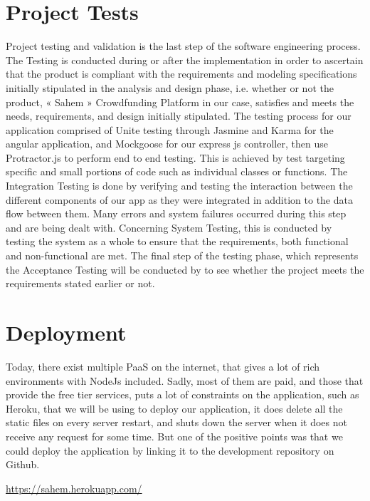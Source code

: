 \section{Project Tests}
Project testing and validation is the last step of the software engineering process. The
Testing is conducted during or after the implementation in order to ascertain that the product is
compliant with the requirements and modeling specifications initially stipulated in the
analysis and design phase, i.e. whether or not the product, « Sahem » Crowdfunding Platform
in our case, satisfies and meets the needs, requirements, and design initially stipulated.
The testing process for our application comprised of Unite testing through Jasmine and Karma for
the angular application, and Mockgoose for our express js controller, then use Protractor.js to perform
end to end testing.
This is achieved by test targeting specific and small portions of code such as individual classes or
functions. 
The Integration Testing is done by verifying and testing the interaction between the
different components of our app as they were integrated in addition to the data flow between
them.
 Many errors and system failures occurred during this step and are being dealt
with. Concerning System Testing, this is conducted by testing the system as a whole to ensure
that the requirements, both functional and non-functional are met. The final step of the testing
phase, which represents the Acceptance Testing will be conducted by \mentor to see whether the project
meets the requirements stated earlier or not.


\section{Deployment}
% 
Today, there exist multiple PaaS on the internet, that gives a lot of rich environments with NodeJs
included. Sadly, most of them are paid, and those that provide the free tier services, puts a lot
of constraints on the application, such as Heroku, that we will be using to deploy our application,
it does delete all the static files on every server restart, and shuts down the server when it does
not receive any request for some time. But one of the positive points was that we could deploy the
application by linking it to the development repository on Github.


\url{https://sahem.herokuapp.com/}

